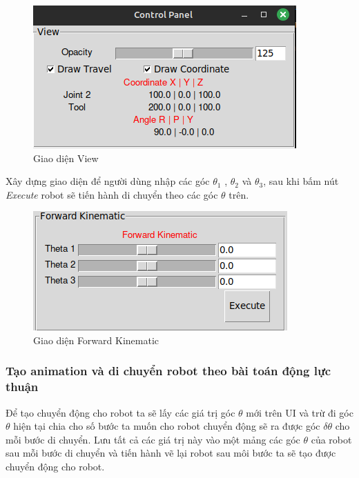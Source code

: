 \begin{figure}[H]
	\centering
	\includegraphics[width=1\linewidth]{Images/view_ui.png}
	\caption{Giao diện View}
	\label{fig:enter-label5}
\end{figure}

Xây dựng giao diện để người dùng nhập các góc $\theta_{1}$ , $\theta_{2}$ và $\theta_{3}$, sau khi bấm nút \textit{Execute} robot sẽ tiến hành di chuyển theo các góc $\theta$ trên.

\begin{figure}[H]
	\centering
	\includegraphics[width=1\linewidth]{Images/forw_ui.png}
	\caption{Giao diện Forward Kinematic}
	\label{fig:enter-label6}
\end{figure}

\subsubsection{Tạo animation và di chuyển robot theo bài toán động lực thuận}

Để tạo chuyển động cho robot ta sẽ lấy các giá trị góc $\theta$ mới trên UI và trừ đi góc $\theta$ hiện tại chia cho số bước ta muốn cho robot chuyển động sẽ ra được góc $\delta\theta$ cho mỗi bước di chuyển. Lưu tất cả các giá trị này vào một mảng các góc $\theta$ của robot sau mỗi bước di chuyển và tiến hành vẽ lại robot sau môi bước ta sẽ tạo được chuyển động cho robot.

